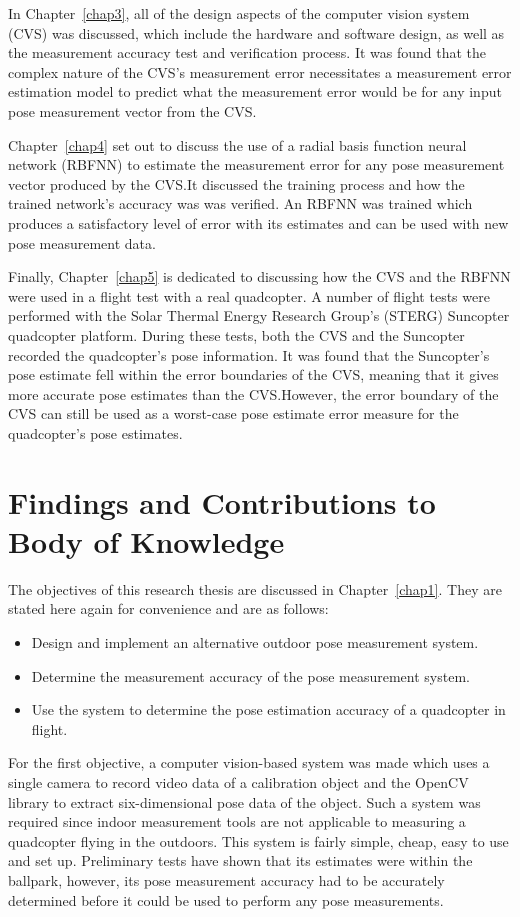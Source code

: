 In Chapter~\ref{chap3}, all of the design aspects of the computer vision system (CVS) was discussed, which include the hardware and software design, as well as the measurement accuracy test and verification process. It was found that the complex nature of the CVS's measurement error necessitates a measurement error estimation model to predict what the measurement error would be for any input pose measurement vector from the CVS.\@ 

Chapter~\ref{chap4} set out to discuss the use of a radial basis function neural network (RBFNN) to estimate the measurement error for any pose measurement vector produced by the CVS.\@ It discussed the training process and how the trained network's accuracy was was verified. An RBFNN was trained which produces a satisfactory level of error with its estimates and can be used with new pose measurement data.

Finally, Chapter~\ref{chap5} is dedicated to discussing how the CVS and the RBFNN were used in a flight test with a real quadcopter. A number of flight tests were performed with the Solar Thermal Energy Research Group's (STERG) Suncopter quadcopter platform. During these tests, both the CVS and the Suncopter recorded the quadcopter's pose information. It was found that the Suncopter's pose estimate fell within the error boundaries of the CVS, meaning that it gives more accurate pose estimates than the CVS.\@ However, the error boundary of the CVS can still be used as a worst-case pose estimate error measure for the quadcopter's pose estimates. 

\section{Findings and Contributions to Body of Knowledge}

The objectives of this research thesis are discussed in Chapter~\ref{chap1}. They are stated here again for convenience and are as follows:

\begin{itemize}
  \item Design and implement an alternative outdoor pose measurement system.
  \item Determine the measurement accuracy of the pose measurement system.
  \item Use the system to determine the pose estimation accuracy of a quadcopter in flight. 
\end{itemize}

For the first objective, a computer vision-based system was made which uses a single camera to record video data of a calibration object and the OpenCV library to extract six-dimensional pose data of the object. Such a system was required since indoor measurement tools are not applicable to measuring a quadcopter flying in the outdoors. This system is fairly simple, cheap, easy to use and set up. Preliminary tests have shown that its estimates were within the ballpark, however, its pose measurement accuracy had to be accurately determined before it could be used to perform any pose measurements. 


